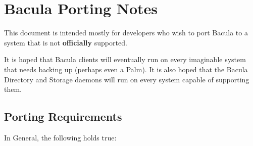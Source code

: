 
\chapter{Bacula Porting Notes}
\label{_ChapterStart1}

This document is intended mostly for developers who wish to port Bacula to a
system that is not {\bf officially} supported. 

It is hoped that Bacula clients will eventually run on every imaginable system
that needs backing up (perhaps even a Palm). It is also hoped that the Bacula
Directory and Storage daemons will run on every system capable of supporting
them. 

\section{Porting Requirements}

In General, the following holds true: 

